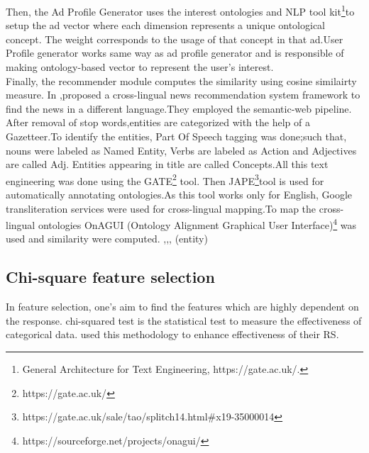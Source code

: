 Then, the Ad Profile Generator uses the interest ontologies and NLP tool kit\footnote{General Architecture for Text Engineering, https://gate.ac.uk/.}to setup the ad vector where each dimension represents a unique ontological concept. The weight corresponds to the usage of that concept in that ad.User Profile generator works same way as ad profile generator and is responsible of making ontology-based vector to represent the user's interest.\\Finally, the recommender module computes the similarity using cosine similairty measure.
In \cite{N25},proposed a cross-lingual news recommendation system framework to find the news in a different language.They employed the semantic-web pipeline. After removal of stop words,entities are categorized with the help of a Gazetteer.To identify the entities, Part Of Speech tagging was done;such that, nouns were labeled as Named Entity, Verbs are labeled as Action and Adjectives are called Adj. Entities appearing in title are called Concepts.All this text engineering was done using the GATE\footnote{https://gate.ac.uk/} tool. Then JAPE\footnote{https://gate.ac.uk/sale/tao/splitch14.html#x19-35000014}tool is used for automatically annotating ontologies.As this tool works only for English, Google transliteration services were used for cross-lingual mapping.To map the cross-lingual ontologies OnAGUI (Ontology Alignment Graphical User Interface)\footnote{https://sourceforge.net/projects/onagui/ } was used and similarity were computed.   
\cite{N10},\cite{N13},\cite{N15},\cite{N23} (entity)
\subsection{Chi-square feature selection}

In feature selection, one's aim to find the features which are highly dependent on the response. chi-squared test is the statistical test to measure the effectiveness of categorical data.\cite{N5} used this methodology to enhance effectiveness of their RS. 

